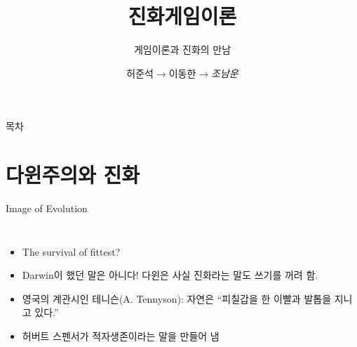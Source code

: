 \documentclass[final]{beamer}
\title{진화게임이론}
\subtitle{게임이론과 진화의 만남}
\author[조남운]{허준석$\rightarrow$이동한$\rightarrow$\emph{조남운}\\\mail}
\begin{document}
\begin{frame}[t]{}
	\titlepage
\end{frame}

\begin{frame}[t]{목차}
	\tableofcontents
\end{frame}

\section{다윈주의와 진화} %
\label{sec:darwinism_and_evolution}

\begin{frame}[t]{Image of Evolution}
	\begin{columns}[c]
		\column{18em}
		\begin{itemize}
			\item The survival of fittest? 
			\item Darwin이 했던 말은 아니다! 다윈은 사실 진화라는 말도 쓰기를 꺼려 함. 
			\item 영국의 계관시인 테니슨(A. Tennyson): 자연은 ``피칠갑을 한 이빨과 발톱을 지니고 있다.''
			\item 허버트 스펜서가 적자생존이라는 말을 만들어 냄 
		\end{itemize}
		\column{13em}
		\hspace{-1em}
	\end{columns}
\end{frame}
\end{document}
